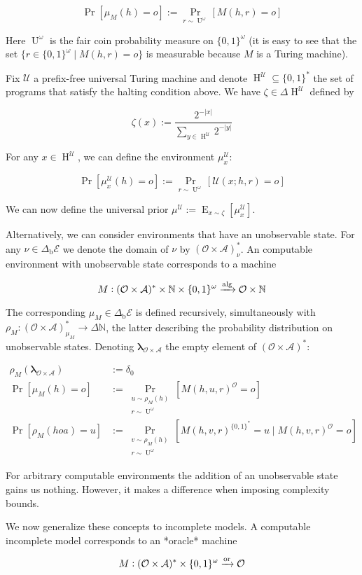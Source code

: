 \documentclass[a4paper]{article}
\newcommand{\Bool}{\{0,1\}}
\newcommand{\Words}{{\Bool^*}}
\newcommand{\Sagas}{{\Bool^\omega}}
\newcommand{\Estr}{{\bm{\lambda}}}
\DeclareMathOperator{\Prb}{Pr}
\newcommand{\PP}[2]{\operatorname{Pr}_{\substack{#1 \\ #2}}}
\DeclareMathOperator{\E}{E}
\DeclareMathOperator{\Un}{U}
\newcommand{\Nats}{\mathbb{N}}
\newcommand{\Abs}[1]{\lvert #1 \rvert}
\newcommand{\Alg}{\xrightarrow{\textnormal{alg}}}
\newcommand{\Or}{\xrightarrow{\textnormal{or}}}
\newcommand{\UTM}{\mathcal{U}}
\newcommand{\SP}[1]{\Delta #1}
\newcommand{\Act}{\mathcal{A}}
\newcommand{\Per}{\mathcal{O}}
\newcommand{\His}{(\Per \times \Act)^*}
\newcommand{\Env}{\mathcal{E}}
\newcommand{\Beh}{\Delta_{\operatorname{b}}}
\newcommand{\EnvB}{\Beh\Env}
\newcommand{\Prog}{\operatorname{H}^\UTM}
\begin{document}
$${\Prb[\mu_M(h)=o]:=\Prb_{r \sim \Un^\omega}[M(h,r)=o]}$$

Here ${\Un^\omega}$ is the fair coin probability measure on ${\Sagas}$ (it is easy to see that the set ${\{r \in \Sagas \mid M(h,r)=o\}}$ is measurable because ${M}$ is a Turing machine). 

Fix ${\UTM}$ a prefix-free universal Turing machine and denote ${\Prog \subseteq \Words}$ the set of programs that satisfy the halting condition above. We have ${\zeta \in \SP{\Prog}}$ defined by

$${\zeta(x):=\frac{2^{-\Abs{x}}}{\sum_{y \in \Prog} 2^{-\Abs{y}}}}$$

For any ${x \in \Prog}$, we can define the environment ${\mu_x^\UTM}$: 

$$\Pr[\mu_x^\UTM(h)=o]:=\Prb_{r \sim \Un^\omega}[\UTM(x;h,r)=o]$$ 

We can now define the universal prior ${\mu^\UTM:=\E_{x \sim \zeta}[\mu_x^\UTM]}$.

Alternatively, we can consider environments that have an unobservable state. For any ${\nu \in \EnvB}$ we denote the domain of ${\nu}$ by ${\His_\nu}$. An computable environment with unobservable state corresponds to a machine

$${M: \His \times \Nats \times \Sagas \Alg \Per \times \Nats}$$ 

The corresponding ${\mu_M \in \EnvB}$ is defined recursively, simultaneously with ${\rho_M: \His_{\mu_M} \rightarrow \SP{\Nats}}$, the latter describing the probability distribution on unobservable states. Denoting ${\Estr_{\Per \times \Act}}$ the empty element of ${\His}$:

\begin{align*}
\rho_{M}(\Estr_{\Per \times \Act}) &:= \delta_0 \\
\Prb[\mu_M(h)=o] &:= \PP{u \sim \rho_{M}(h)}{r \sim \Un^\omega}[M(h,u,r)^\Per=o] \\
\Prb[\rho_{M}(hoa)=u] &:= \PP{v \sim \rho_{M}(h)}{r \sim \Un^\omega}[M(h,v,r)^\Words=u \mid M(h,v,r)^\Per=o]
\end{align*}

For arbitrary computable environments the addition of an unobservable state gains us nothing. However, it makes a difference when imposing complexity bounds.

We now generalize these concepts to incomplete models. A computable incomplete model corresponds to an *oracle* machine 

$${M: \His \times \Sagas \Or \Per}$$
\end{document}

